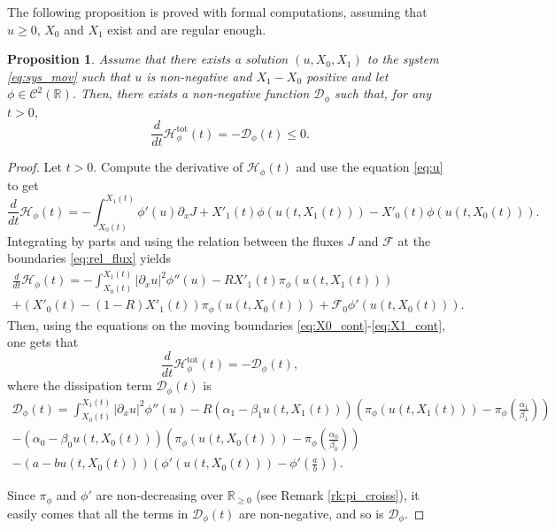\documentclass{amsart}
\newcommand\R{\mathbb{R}}
\newcommand\Flux{\mathcal{F}}
\renewcommand\d[1]{\partial_{#1}}
\renewcommand\H{\mathcal{H}_{\phi}}
\newcommand\intmov{\int_{X_0(t)}^{X_1(t)}}
\newtheorem{proposition}[theorem]{Proposition}
\begin{document}
	\noindent
	The following proposition is proved with formal computations, assuming that $u \geq 0$,  $X_0$ and $X_1$ exist and are regular enough. 
	\begin{proposition} \label{prop:energy_dec}
		 Assume that there exists a solution $(u, X_0, X_1)$ to the system \eqref{eq:sys_mov} such that $u$ is non-negative and $X_1-X_0$ positive and let $\phi \in \mathcal{C}^2(\R)$. Then, there exists a non-negative function $\mathcal{D}_\phi$ such that, for any $t > 0$,
		\begin{equation*}
			\dfrac{d}{dt} \H^{\text{tot}}(t) = -\mathcal{D}_\phi(t) \leq 0.
		\end{equation*}
	\end{proposition}
	\begin{proof} 
		Let $t > 0$. Compute the derivative of $\H(t)$ and use the equation \eqref{eq:u} to get
		\begin{equation*}
			\frac{d}{dt}\H(t) = - \intmov \phi'(u)\d{x}J + X'_1(t) \phi(u(t,X_1(t))) - X'_0(t) \phi(u(t,X_0(t))).
		\end{equation*}
		Integrating by parts and using the relation between the fluxes $J$ and $\Flux$ at the boundaries \eqref{eq:rel_flux} yields
		\begin{multline*}
			\frac{d}{dt}\H(t) = -\intmov \lvert \d{x}u \rvert^2\phi''(u) - RX'_1(t)\pi_\phi(u(t,X_1(t))) \\
	+ (X'_0(t) - (1-R)X'_1(t))\pi_\phi(u(t,X_0(t))) + \Flux_0 \phi'(u(t,X_0(t))).
		\end{multline*}
		Then, using the equations on the moving boundaries \eqref{eq:X0_cont}-\eqref{eq:X1_cont}, one gets that
		\begin{equation*}
			\frac{d}{dt}\H^{\text{tot}}(t) = - \mathcal{D}_\phi(t),
		\end{equation*}
		where the dissipation term $\mathcal{D}_\phi(t)$ is 
		\begin{multline*} \label{eq:diss_term}
			\mathcal{D}_\phi(t) = \intmov \vert \d{x}u \vert ^2 \phi''(u) - R(\alpha_1 - \beta_1 u(t,X_1(t))) \left(\pi_\phi(u(t,X_1(t))) - \pi_\phi \left( \frac{\alpha_1}{\beta_1} \right) \right) \\
		- (\alpha_0 - \beta_0 u(t,X_0(t))) \left( \pi_\phi(u(t,X_0(t))) - \pi_\phi \left( \frac{\alpha_0}{\beta_0} \right) \right) \\
		- (a - b u(t, X_0(t))) \left( \phi'(u(t,X_0(t))) - \phi' \left( \frac{a}{b} \right) \right).
		\end{multline*} 
		
		Since $\pi_\phi$ and $\phi'$ are non-decreasing over $\R_{\geq 0}$ (see Remark \ref{rk:pi_croiss}), it easily comes that all the terms in $\mathcal{D}_\phi(t)$ are non-negative, and so is $\mathcal{D}_\phi$.
	\end{proof}
	
\end{document}
